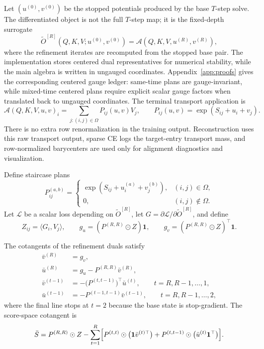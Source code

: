 Let $(u^{(0)},v^{(0)})$ be the stopped potentials produced by the base $T$-step solve. The differentiated object is not the full $T$-step map; it is the fixed-depth surrogate
\[
\widetilde O^{[R]}(Q,K,V;u^{(0)},v^{(0)}) = \mathcal{A}(Q,K,V,u^{(R)},v^{(R)}),
\]
where the refinement iterates are recomputed from the stopped base pair. The implementation stores centered dual representatives for numerical stability, while the main algebra is written in ungauged coordinates. Appendix~\ref{app:proofs} gives the corresponding centered gauge ledger: same-time plans are gauge-invariant, while mixed-time centered plans require explicit scalar gauge factors when translated back to ungauged coordinates.
The terminal transport application is
\[
\mathcal{A}(Q,K,V,u,v)_i
=
\sum_{j:(i,j)\in\Omega} P_{ij}(u,v)V_j,
\qquad
P_{ij}(u,v)=\exp(S_{ij}+u_i+v_j).
\]
There is no extra row renormalization in the training output. Reconstruction uses this raw transport output, sparse CE logs the target-entry transport mass, and row-normalized barycenters are used only for alignment diagnostics and visualization.

Define staircase plans
\[
P_{ij}^{(a,b)} =
\begin{cases}
\exp(S_{ij}+u_i^{(a)}+v_j^{(b)}), & (i,j)\in\Omega, \\
0, & (i,j)\notin\Omega.
\end{cases}
\]
Let $\mathcal{L}$ be a scalar loss depending on $\widetilde O^{[R]}$, let $G=\partial \mathcal{L}/\partial \widetilde O^{[R]}$, and define
\[
Z_{ij}=\langle G_i, V_j\rangle,
\qquad
g_u=(P^{(R,R)}\odot Z)\mathbf{1},
\qquad
g_v=(P^{(R,R)}\odot Z)^\top\mathbf{1}.
\]

\begin{proposition}\label{prop:tail_adjoint_main}
The cotangents of the refinement duals satisfy
\begin{align}
    \bar v^{(R)} &= g_v, \\
    \bar u^{(R)} &= g_u - P^{(R,R)}\bar v^{(R)}, \\
    \bar v^{(t-1)} &= -\bigl(P^{(t,t-1)}\bigr)^\top \bar u^{(t)}, \qquad t=R,R-1,\dots,1, \\
    \bar u^{(t-1)} &= -P^{(t-1,t-1)}\bar v^{(t-1)}, \qquad t=R,R-1,\dots,2,
\end{align}
where the final line stops at $t=2$ because the base state is stop-gradient. The score-space cotangent is
\begin{equation}
\label{eq:generic_score_vjp_unified}
\bar S
=
P^{(R,R)} \odot Z
-
\sum_{t=1}^R
\Bigl[
P^{(t,t)} \odot \bigl(\mathbf{1}\bar v^{(t)\top}\bigr)
+
P^{(t,t-1)} \odot \bigl(\bar u^{(t)}\mathbf{1}^\top\bigr)
\Bigr].
\end{equation}
\end{proposition}

